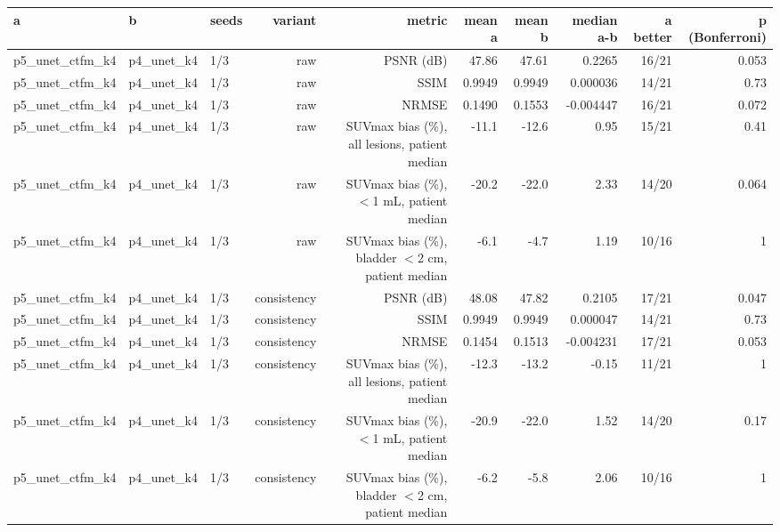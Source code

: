 \begin{tabular}{lllrrrrrrr}
\toprule
a & b & seeds & variant & metric & mean a & mean b & median a-b & a better & p (Bonferroni) \\
\midrule
p5\_unet\_ctfm\_k4 & p4\_unet\_k4 & 1/3 & raw & PSNR (dB) & 47.86 & 47.61 & 0.2265 & 16/21 & 0.053 \\
p5\_unet\_ctfm\_k4 & p4\_unet\_k4 & 1/3 & raw & SSIM & 0.9949 & 0.9949 & 0.000036 & 14/21 & 0.73 \\
p5\_unet\_ctfm\_k4 & p4\_unet\_k4 & 1/3 & raw & NRMSE & 0.1490 & 0.1553 & -0.004447 & 16/21 & 0.072 \\
p5\_unet\_ctfm\_k4 & p4\_unet\_k4 & 1/3 & raw & SUVmax bias (\%), all lesions, patient median & -11.1 & -12.6 & 0.95 & 15/21 & 0.41 \\
p5\_unet\_ctfm\_k4 & p4\_unet\_k4 & 1/3 & raw & SUVmax bias (\%), $<$1 mL, patient median & -20.2 & -22.0 & 2.33 & 14/20 & 0.064 \\
p5\_unet\_ctfm\_k4 & p4\_unet\_k4 & 1/3 & raw & SUVmax bias (\%), bladder $<$2 cm, patient median & -6.1 & -4.7 & 1.19 & 10/16 & 1 \\
p5\_unet\_ctfm\_k4 & p4\_unet\_k4 & 1/3 & consistency & PSNR (dB) & 48.08 & 47.82 & 0.2105 & 17/21 & 0.047 \\
p5\_unet\_ctfm\_k4 & p4\_unet\_k4 & 1/3 & consistency & SSIM & 0.9949 & 0.9949 & 0.000047 & 14/21 & 0.73 \\
p5\_unet\_ctfm\_k4 & p4\_unet\_k4 & 1/3 & consistency & NRMSE & 0.1454 & 0.1513 & -0.004231 & 17/21 & 0.053 \\
p5\_unet\_ctfm\_k4 & p4\_unet\_k4 & 1/3 & consistency & SUVmax bias (\%), all lesions, patient median & -12.3 & -13.2 & -0.15 & 11/21 & 1 \\
p5\_unet\_ctfm\_k4 & p4\_unet\_k4 & 1/3 & consistency & SUVmax bias (\%), $<$1 mL, patient median & -20.9 & -22.0 & 1.52 & 14/20 & 0.17 \\
p5\_unet\_ctfm\_k4 & p4\_unet\_k4 & 1/3 & consistency & SUVmax bias (\%), bladder $<$2 cm, patient median & -6.2 & -5.8 & 2.06 & 10/16 & 1 \\
\bottomrule
\end{tabular}
